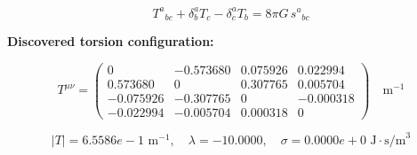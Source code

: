 
\begin{equation}
  T^a{}_{bc} + \delta^a_b T_c - \delta^a_c T_b = 8\pi G \, s^a{}_{bc}
\end{equation}

\textbf{Discovered torsion configuration:}

\begin{equation}
  T^{\mu\nu} = \begin{pmatrix}
    0 & -0.573680 & 0.075926 & 0.022994 \\
    0.573680 & 0 & 0.307765 & 0.005704 \\
    -0.075926 & -0.307765 & 0 & -0.000318 \\
    -0.022994 & -0.005704 & 0.000318 & 0
  \end{pmatrix} \quad \text{m}^{-1}
\end{equation}

\begin{equation}
  |T| = 6.5586e-1 \text{ m}^{-1}, \quad
  \lambda = -10.0000, \quad
  \sigma = 0.0000e+0 \text{ J}\cdot\text{s/m}^3
\end{equation}